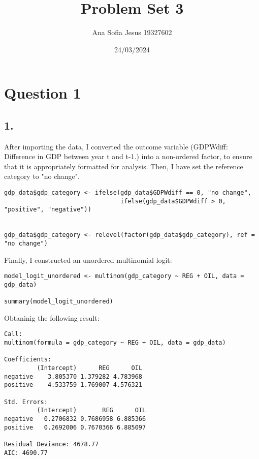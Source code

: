 \documentclass[oneside]{article}
\title{Problem Set 3}
\author{Ana Sofia Jesus 19327602}
\date{24/03/2024}
\begin{document}
\maketitle

\section*{Question 1}
\subsection*{1.}
After importing the data, I converted the outcome variable (GDPWdiff: Difference in GDP between year t and t-1.) into a non-ordered factor, to ensure that it is appropriately formatted for analysis.
Then, I have set the reference category to "no change".
\begin{verbatim}
gdp_data$gdp_category <- ifelse(gdp_data$GDPWdiff == 0, "no change", 
                                ifelse(gdp_data$GDPWdiff > 0, "positive", "negative"))


gdp_data$gdp_category <- relevel(factor(gdp_data$gdp_category), ref = "no change")
\end{verbatim}
Finally, I constructed an unordered multinomial logit:
\begin{verbatim}
model_logit_unordered <- multinom(gdp_category ~ REG + OIL, data = gdp_data)

summary(model_logit_unordered)
 \end{verbatim}
Obtaninig the following result:
\begin{verbatim}
Call:
multinom(formula = gdp_category ~ REG + OIL, data = gdp_data)

Coefficients:
         (Intercept)      REG      OIL
negative    3.805370 1.379282 4.783968
positive    4.533759 1.769007 4.576321

Std. Errors:
         (Intercept)       REG      OIL
negative   0.2706832 0.7686958 6.885366
positive   0.2692006 0.7670366 6.885097

Residual Deviance: 4678.77 
AIC: 4690.77     
\end{verbatim}
\end{document}
